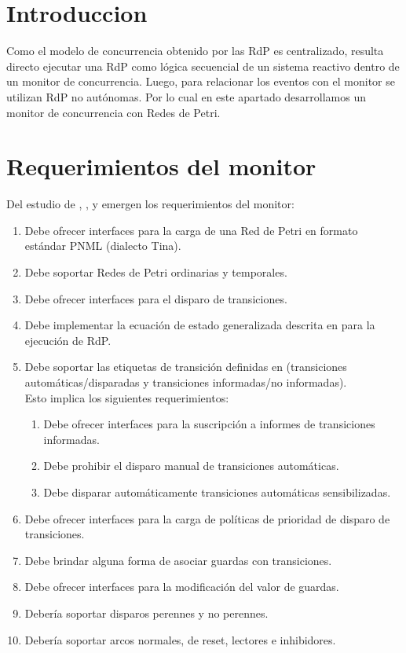 \section{Introduccion}
\label{sec:petri_concurrency_monitor_intro}
Como el modelo de concurrencia obtenido por las RdP es centralizado, resulta
directo ejecutar una RdP como lógica secuencial de un sistema reactivo dentro
de un monitor de concurrencia. Luego, para relacionar los eventos con el
monitor se utilizan RdP no autónomas. Por lo cual en este apartado desarrollamos
un monitor de concurrencia con Redes de Petri.

\section{Requerimientos del monitor}
Del estudio de \cite{Ecuacion_generalizada_LAC}, \cite{codegen}, \cite{chimp} y
\cite{Bentivegna-Ludemann} emergen los requerimientos del monitor:
\begin{enumerate}
  \item Debe ofrecer interfaces para la carga de una Red de Petri en formato
  estándar PNML (dialecto Tina).
  \item Debe soportar Redes de Petri ordinarias y temporales.
  \item Debe ofrecer interfaces para el disparo de transiciones.
  \item Debe implementar la ecuación de estado generalizada descrita en
  \cite{Ecuacion_generalizada_LAC} para la ejecución de RdP.
  \item Debe soportar las etiquetas de transición definidas en \cite{codegen}
  (transiciones automáticas/disparadas y transiciones informadas/no
  informadas).\\
  Esto implica los siguientes requerimientos:
  \begin{enumerate}
    \item Debe ofrecer interfaces para la suscripción a informes de transiciones
    informadas.
    \item Debe prohibir el disparo manual de transiciones automáticas.
    \item Debe disparar automáticamente transiciones automáticas sensibilizadas.
  \end{enumerate}
  \item Debe ofrecer interfaces para la carga de políticas de prioridad de
  disparo de transiciones.
  \item Debe brindar alguna forma de asociar guardas con transiciones.
  \item Debe ofrecer interfaces para la modificación del valor de guardas.
  \item Debería soportar disparos perennes y no perennes.
  \item Debería soportar arcos normales, de reset, lectores e inhibidores.
\end{enumerate}

